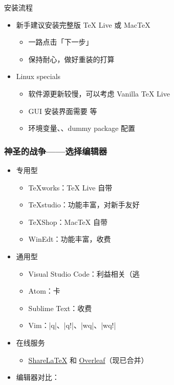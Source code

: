 \begin{frame}{安装流程}
\begin{itemize}
  \item 新手建议安装完整版 \TeX{} Live 或 Mac\TeX{}
    \begin{itemize}
      \item 一路点击「下一步」
      \item 保持耐心，做好重装的打算
    \end{itemize}
  \item<+-> Linux specials
    \begin{itemize}
      \item 软件源更新较慢，可以考虑 Vanilla \TeX{} Live
      \item GUI 安装界面需要  等
      \item 环境变量、、dummy package 配置
    \end{itemize}
\end{itemize}
\end{frame}

\begin{frame}[fragile]
\frametitle{神圣的战争——选择编辑器}
\begin{itemize}
  \item<+-> 专用型
    \begin{itemize}
      \item TeXworks：\TeX{} Live 自带 \faWindows{} \faApple{} \faLinux{}
      \item TeXstudio：功能丰富，对新手友好 \faWindows{} \faApple{} \faLinux{}
      \item TeXShop：Mac\TeX{} 自带 \faApple{}
      \item WinEdt：功能丰富，收费 \faWindows{}
    \end{itemize}
  \item<+-> 通用型
    \begin{itemize}
      \item Visual Studio Code：利益相关（逃
      \item Atom：卡
      \item Sublime Text：收费
      \item Vim：|q|、|q!|、|wq|、|wq!|
    \end{itemize}
  \item<+-> 在线服务
    \begin{itemize}
      \item \href{https://www.sharelatex.com}{\textcolor{酡红}{ShareLaTeX}} 和
            \href{https://www.overleaf.com}{\textcolor{松花绿}{Overleaf}}（现已合并）
    \end{itemize}
  \item<+-> 编辑器对比：
\end{itemize}
\end{frame}
